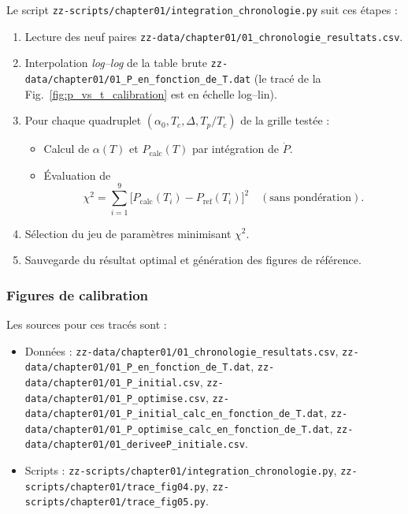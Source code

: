 Le script \texttt{zz-scripts/chapter01/integration\_chronologie.py} suit ces étapes :
\begin{enumerate}
  \item Lecture des neuf paires \texttt{zz-data/chapter01/01\_chronologie\_resultats.csv}.
  \item Interpolation \emph{log–log} de la table brute
      \texttt{zz-data/chapter01/01\_P\_en\_fonction\_de\_T.dat}
      (le tracé de la Fig.~\ref{fig:p_vs_t_calibration} est en échelle log–lin).
  \item Pour chaque quadruplet
        \((\alpha_{0},T_{c},\Delta,T_{p}/T_{c})\) de la grille testée :
    \begin{itemize}
      \item Calcul de \(\alpha(T)\) et \(P_{\mathrm{calc}}(T)\) par intégration de \(\dot P\).
      \item Évaluation de
      \[
        \chi^{2}
        =
        \sum_{i=1}^{9}
        \bigl[P_{\mathrm{calc}}(T_{i}) - P_{\mathrm{ref}}(T_{i})\bigr]^{2}
        \quad(\text{sans pondération}).
      \]
    \end{itemize}
  \item Sélection du jeu de paramètres minimisant \(\chi^{2}\).
  \item Sauvegarde du résultat optimal et génération des figures de référence.
\end{enumerate}

\subsubsection{Figures de calibration}

Les sources pour ces tracés sont :
\begin{itemize}
  \item Données :
    \texttt{zz-data/chapter01/01\_chronologie\_resultats.csv},
    \texttt{zz-data/chapter01/01\_P\_en\_fonction\_de\_T.dat},
    \texttt{zz-data/chapter01/01\_P\_initial.csv},
    \texttt{zz-data/chapter01/01\_P\_optimise.csv},
    \texttt{zz-data/chapter01/01\_P\_initial\_calc\_en\_fonction\_de\_T.dat},
    \texttt{zz-data/chapter01/01\_P\_optimise\_calc\_en\_fonction\_de\_T.dat},
    \texttt{zz-data/chapter01/01\_deriveeP\_initiale.csv}.
  \item Scripts :
    \texttt{zz-scripts/chapter01/integration\_chronologie.py},
    \texttt{zz-scripts/chapter01/trace\_fig04.py},
    \texttt{zz-scripts/chapter01/trace\_fig05.py}.
\end{itemize}

